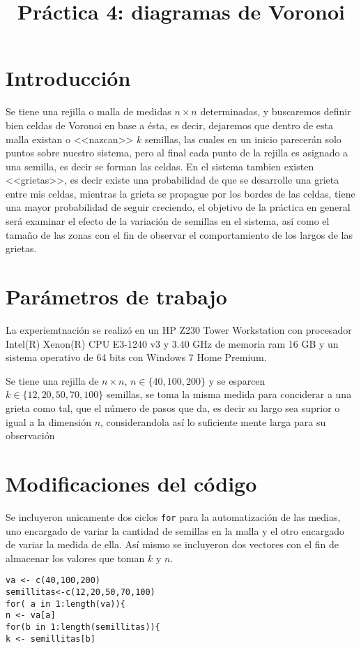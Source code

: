 \documentclass[a4paper]{article}
\title{Práctica 4: diagramas de Voronoi}
\date{}
\begin{document}
\maketitle

\section{Introducci\'on}
Se tiene una rejilla o malla de medidas $n\times n$ determinadas, y buscaremos definir bien celdas de Voronoi en base a ésta, es decir, dejaremos que dentro de esta malla existan o <<nazcan>> $k$ semillas, las cuales en un inicio parecerán solo puntos sobre nuestro sistema, pero al final cada punto de la rejilla es asignado a una semilla, es decir se forman las celdas. En el sistema tambien existen <<grietas>>, es decir existe una probabilidad de que se desarrolle una grieta entre mis celdas, mientras la grieta se propague por los bordes de las celdas, tiene una mayor probabilidad de seguir creciendo, el objetivo de la práctica en general será examinar el efecto de la variación de semillas en el sistema, así como el tamaño de las zonas con el fin de observar el comportamiento de los largos de las grietas.

\section{Par\'ametros de trabajo}
La experiemtnación se realizó en un HP Z230 Tower Workstation con procesador Intel(R) Xenon(R) CPU E3-1240 v3 y 3.40 GHz de memoria ram 16 GB y un sistema operativo de 64 bits con Windows 7 Home Premium.

Se tiene una rejilla de $n\times n$,  $n \in \{40, 100, 200\} $ y se esparcen $k \in \{12,20,50,70,100\}$ semillas, se toma la misma medida para conciderar a una grieta como tal, que el número de pasos que da, es decir su largo sea suprior o igual a la dimensión $n$, considerandola así lo suficiente mente larga para su observación

\section{Modificaciones del código}
Se incluyeron unicamente dos ciclos \texttt{for} para la automatización de las medias, uno encargado de variar la cantidad de semillas en la malla y el otro encargado de variar la medida de ella. Así mismo se incluyeron dos vectores con el fin de almacenar los valores que toman $k$ y $n$.

\begin{lstlisting}[frame=single]
va <- c(40,100,200)
semillitas<-c(12,20,50,70,100)
for( a in 1:length(va)){
n <- va[a]
for(b in 1:length(semillitas)){
k <- semillitas[b]
\end{lstlisting}
\end{document}
